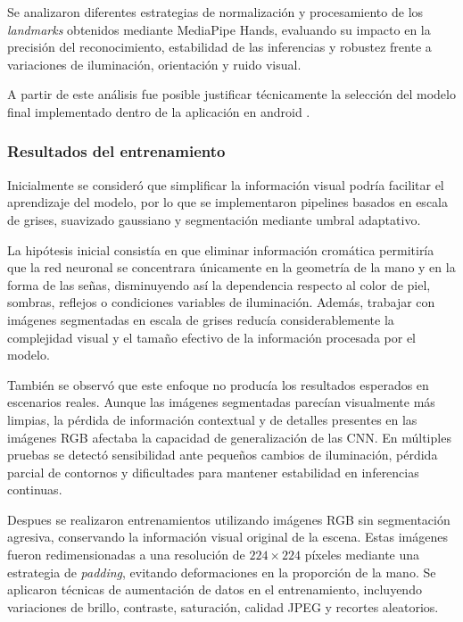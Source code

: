 	Se analizaron diferentes estrategias de normalización y procesamiento de los \textit{landmarks} obtenidos mediante MediaPipe Hands, evaluando su impacto en la precisión del reconocimiento, estabilidad de las inferencias y robustez frente a variaciones de iluminación, orientación y ruido visual.
	
	A partir de este análisis fue posible justificar técnicamente la selección del modelo final implementado dentro de la aplicación en android .
	
	\subsubsection{Resultados del entrenamiento}
	
	Inicialmente se consideró que simplificar la información visual podría facilitar el aprendizaje del modelo, por lo que se implementaron pipelines basados en escala de grises, suavizado gaussiano y segmentación mediante umbral adaptativo.
	
	La hipótesis inicial consistía en que eliminar información cromática permitiría que la red neuronal se concentrara únicamente en la geometría de la mano y en la forma de las señas, disminuyendo así la dependencia respecto al color de piel, sombras, reflejos o condiciones variables de iluminación. Además, trabajar con imágenes segmentadas en escala de grises reducía considerablemente la complejidad visual y el tamaño efectivo de la información procesada por el modelo.
	
	También se observó que este enfoque no producía los resultados esperados en escenarios reales. Aunque las imágenes segmentadas parecían visualmente más limpias, la pérdida de información contextual y de detalles presentes en las imágenes RGB afectaba la capacidad de generalización de las CNN. En múltiples pruebas se detectó sensibilidad ante pequeños cambios de iluminación, pérdida parcial de contornos y dificultades para mantener estabilidad en inferencias continuas.
	
	Despues se realizaron entrenamientos utilizando imágenes RGB sin segmentación agresiva, conservando la información visual original de la escena. Estas imágenes fueron redimensionadas a una resolución de $224 \times 224$ píxeles mediante una estrategia de \textit{padding}, evitando deformaciones en la proporción de la mano. Se aplicaron técnicas de aumentación de datos en el entrenamiento, incluyendo variaciones de brillo, contraste, saturación, calidad JPEG y recortes aleatorios.
	
